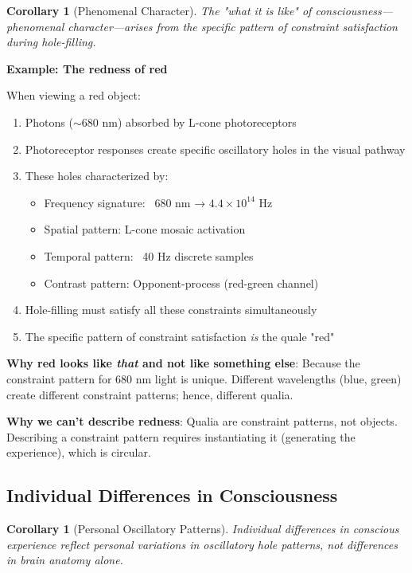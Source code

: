 \documentclass[11pt,a4paper]{article}
\newtheorem{corollary}[theorem]{Corollary}
\begin{document}
\begin{corollary}[Phenomenal Character]
The "what it is like" of consciousness—phenomenal character—arises from the specific pattern of constraint satisfaction during hole-filling.
\end{corollary}

\textbf{Example: The redness of red}

When viewing a red object:
\begin{enumerate}
\item Photons ($\sim$680 nm) absorbed by L-cone photoreceptors
\item Photoreceptor responses create specific oscillatory holes in the visual pathway
\item These holes characterized by:
\begin{itemize}
\item Frequency signature: ~680 nm → $4.4 \times 10^{14}$ Hz
\item Spatial pattern: L-cone mosaic activation
\item Temporal pattern: ~40 Hz discrete samples
\item Contrast pattern: Opponent-process (red-green channel)
\end{itemize}
\item Hole-filling must satisfy all these constraints simultaneously
\item The specific pattern of constraint satisfaction \textit{is} the quale "red"
\end{enumerate}

\textbf{Why red looks like \textit{that} and not like something else}: Because the constraint pattern for 680 nm light is unique. Different wavelengths (blue, green) create different constraint patterns; hence, different qualia.

\textbf{Why we can't describe redness}: Qualia are constraint patterns, not objects. Describing a constraint pattern requires instantiating it (generating the experience), which is circular.

\subsection{Individual Differences in Consciousness}

\begin{corollary}[Personal Oscillatory Patterns]
Individual differences in conscious experience reflect personal variations in oscillatory hole patterns, not differences in brain anatomy alone.
\end{corollary}
\end{document}
